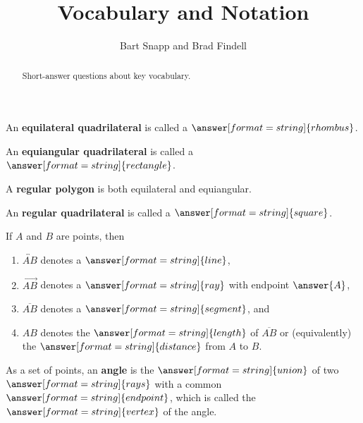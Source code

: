 \documentclass[nooutcomes]{ximera}
\title{Vocabulary and Notation}
\author{Bart Snapp and Brad Findell}
\begin{document}
\begin{abstract}
Short-answer questions about key vocabulary. 
\end{abstract}
\maketitle


\begin{question}  
An \textbf{equilateral quadrilateral} is called a $\answer[format=string]{rhombus}$.
\end{question}

\begin{question}  
An \textbf{equiangular quadrilateral} is called a $\answer[format=string]{rectangle}$. 
\end{question}

A \textbf{regular polygon} is both equilateral and equiangular. 

\begin{question}  
An \textbf{regular quadrilateral} is called a $\answer[format=string]{square}$. 
\end{question}


\begin{question}
If $A$ and $B$ are points, then 
\begin{enumerate}
\item $\overleftrightarrow{AB}$ denotes a $\answer[format=string]{line}$, 
\item $\overrightarrow{AB}$ denotes a $\answer[format=string]{ray}$ with endpoint $\answer{A}$,  
\item $\overline{AB}$ denotes a $\answer[format=string]{segment}$, and 
\item $AB$ denotes the $\answer[format=string]{length}$ of $\overline{AB}$ or (equivalently) the $\answer[format=string]{distance}$ from $A$ to $B$.  
\end{enumerate}
\end{question}


\begin{question}
As a set of points, an \textbf{angle} is the $\answer[format=string]{union}$ of two $\answer[format=string]{rays}$ with a common $\answer[format=string]{endpoint}$, which is called the $\answer[format=string]{vertex}$ of the angle.  \end{question}
\end{document}
